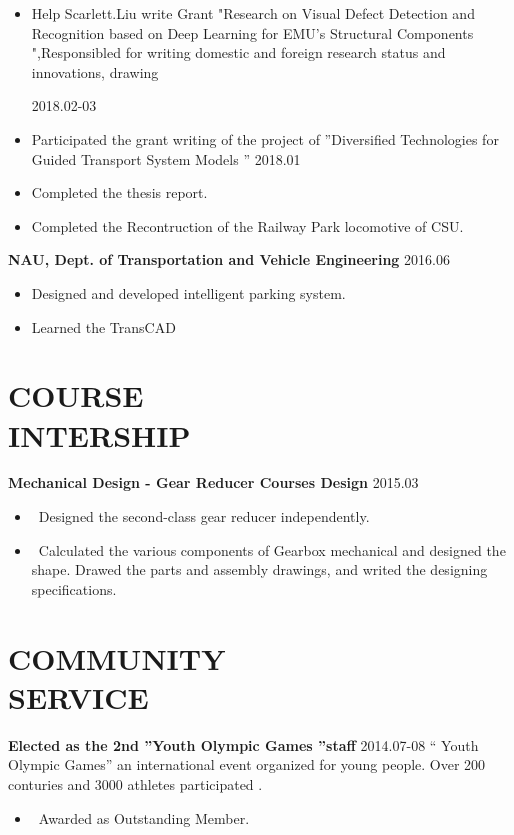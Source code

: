 \documentclass[margin]{res}
\begin{document}
\begin{resume}
                 \begin{itemize}  
                 \itemsep -2pt %
                 \item  Help Scarlett.Liu write Grant "Research on Visual Defect Detection and Recognition based on Deep Learning for EMU's Structural Components 
",Responsibled for writing domestic and foreign research status and innovations, drawing              
                 
                 \hfill 2018.02-03       \item  Participated the grant writing of the project of ''Diversified Technologies for Guided Transport System Models  '' \hfill 2018.01
                \item   Completed the thesis report.
                \item   Completed the Recontruction of  the Railway Park locomotive of CSU.
                \end{itemize}
 
               \textbf { NAU, Dept. of Transportation and Vehicle Engineering   } \hfill 2016.06
                 \begin{itemize}  \itemsep -2pt %
                 \item Designed and developed intelligent parking system.
                 \item Learned the TransCAD 
                 \end{itemize} 
               
\section{COURSE \\ INTERSHIP}  \textbf {Mechanical Design - Gear Reducer Courses Design} \hfill{2015.03}
\begin{itemize}  
                 \item \ Designed the second-class gear reducer independently. 
                 \item \ Calculated the various components of Gearbox mechanical and designed the shape. Drawed the parts and assembly drawings, and writed the designing specifications.
                 \end{itemize} 



\section{COMMUNITY \\ SERVICE}  \textbf {Elected as the 2nd ''Youth Olympic Games ''staff}            \hfill{2014.07-08}
                 \newline `` Youth Olympic Games''  an international event organized for young people. Over 200 conturies and 3000 athletes participated . 
  \begin{itemize}  
  \item \ Awarded as Outstanding Member.
   \end{itemize} 

\end{resume}
\end{document}
